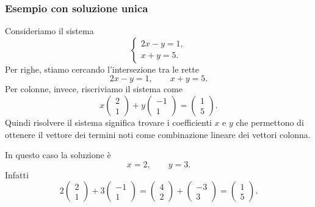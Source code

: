 \documentclass[a4paper]{article}
\begin{document}
\subsubsection{Esempio con soluzione unica}

Consideriamo il sistema
\[
    \begin{cases}
        2x-y=1,\\
        x+y=5.
    \end{cases}
\]
Per righe, stiamo cercando l'intersezione tra le rette
\[
    2x-y=1,
    \qquad
    x+y=5.
\]
Per colonne, invece, riscriviamo il sistema come
\[
    x
    \begin{pmatrix}
        2\\
        1
    \end{pmatrix}
    +
    y
    \begin{pmatrix}
        -1\\
        1
    \end{pmatrix}
    =
    \begin{pmatrix}
        1\\
        5
    \end{pmatrix}.
\]
Quindi risolvere il sistema significa trovare i coefficienti \(x\) e \(y\) che permettono di ottenere il vettore dei termini noti come combinazione lineare dei vettori colonna.

In questo caso la soluzione è
\[
    x=2,
    \qquad
    y=3.
\]
Infatti
\[
    2
    \begin{pmatrix}
        2\\
        1
    \end{pmatrix}
    +
    3
    \begin{pmatrix}
        -1\\
        1
    \end{pmatrix}
    =
    \begin{pmatrix}
        4\\
        2
    \end{pmatrix}
    +
    \begin{pmatrix}
        -3\\
        3
    \end{pmatrix}
    =
    \begin{pmatrix}
        1\\
        5
    \end{pmatrix}.
\]

\begin{center}
\end{center}
\end{document}
